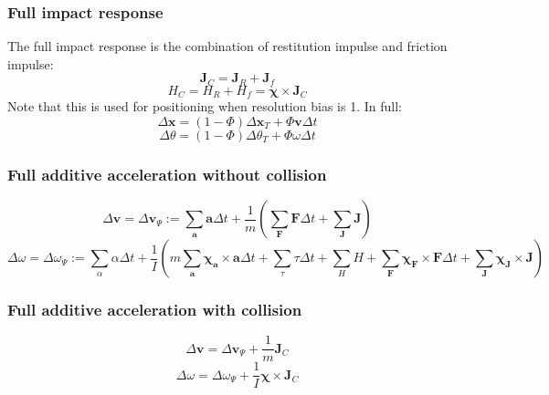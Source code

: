\documentclass[10pt]{report}
\begin{document}
\subsubsection{Full impact response}
The full impact response is the combination of restitution impulse and friction impulse:
\begin{equation}\boldsymbol{J}_C=\boldsymbol{J}_R+\boldsymbol{J}_f\end{equation}
\begin{equation}H_C=H_R+H_f=\boldsymbol{\chi}\times\boldsymbol{J}_C\end{equation}
Note that this is used for positioning when resolution bias is 1. In full:
\begin{equation}\Delta\boldsymbol{x}=(1-\Phi)\Delta\boldsymbol{x}_T+\Phi\boldsymbol{v}\Delta t\end{equation}
\begin{equation}\Delta\theta=(1-\Phi)\Delta\theta_T+\Phi\omega\Delta t\end{equation}

\subsubsection{Full additive acceleration without collision}
\begin{equation}\Delta\boldsymbol{v}=\Delta\boldsymbol{v}_\Psi:=\sum_{\boldsymbol{a}}\boldsymbol{a}\Delta t+\frac{1}{m}\left(\sum_{\boldsymbol{F}}\boldsymbol{F}\Delta t+\sum_{\boldsymbol{J}}\boldsymbol{J}\right)\end{equation}
\begin{equation}\Delta\omega=\Delta\omega_\Psi:=\sum_\alpha\alpha\Delta t+\frac{1}{I}\left(m\sum_{\boldsymbol{a}}\boldsymbol{\chi}_{\boldsymbol{a}}\times\boldsymbol{a}\Delta t+\sum_\tau\tau\Delta t+\sum_HH+\sum_{\boldsymbol{F}}\boldsymbol{\chi_{\boldsymbol{F}}}\times{\boldsymbol{F}}\Delta t+\sum_{\boldsymbol{J}}\boldsymbol{\chi_{\boldsymbol{J}}}\times{\boldsymbol{J}}\right)\end{equation}

\subsubsection{Full additive acceleration with collision}
\begin{equation}\Delta\boldsymbol{v}=\Delta\boldsymbol{v}_\Psi+\frac{1}{m}\boldsymbol{J}_C\end{equation}
\begin{equation}\Delta\omega=\Delta\omega_\Psi+\frac{1}{I}\boldsymbol{\chi}\times\boldsymbol{J}_C\end{equation}
\end{document}

